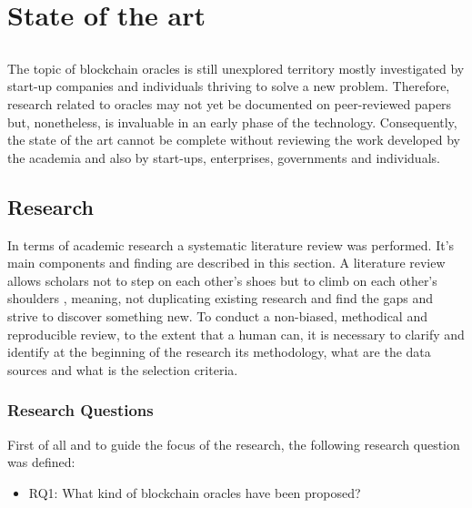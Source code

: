 \chapter{State of the art} \label{chap:sota}

\section*{}



The topic of blockchain oracles is still unexplored territory mostly investigated by start-up companies and individuals thriving to solve a new problem. Therefore, research related to oracles may not yet be documented on peer-reviewed papers but, nonetheless, is invaluable in an early phase of the technology. Consequently, the state of the art cannot be complete without reviewing the work developed by the academia and also by start-ups, enterprises, governments and individuals. 

\section{Research}

In terms of academic research a systematic literature review was performed. It's main components and finding are described in this section. 
A literature review allows scholars not to step on each other's shoes but to climb on each other's shoulders \cite{Kitchenham2007GuidelinesEngineering}, meaning, not duplicating existing research and find the gaps and strive to discover something new. To conduct a non-biased, methodical and reproducible review, to the extent that a human can, it is necessary to clarify and identify at the beginning of the research its methodology, what are the data sources and what is the selection criteria. 

\subsection{Research Questions}
First of all and to guide the focus of the research, the following research question was defined:
\begin{itemize}
\item RQ1: What kind of blockchain oracles have been proposed?
\end{itemize}


